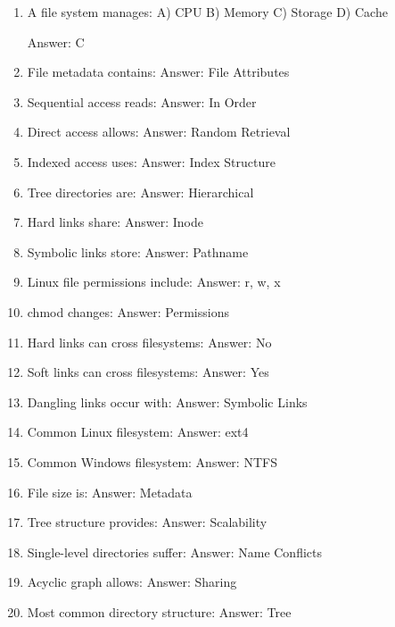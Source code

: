 \begin{enumerate}
\item A file system manages:
A) CPU
B) Memory
C) Storage
D) Cache

Answer: C

\item File metadata contains:
Answer: File Attributes

\item Sequential access reads:
Answer: In Order

\item Direct access allows:
Answer: Random Retrieval

\item Indexed access uses:
Answer: Index Structure

\item Tree directories are:
Answer: Hierarchical

\item Hard links share:
Answer: Inode

\item Symbolic links store:
Answer: Pathname

\item Linux file permissions include:
Answer: r, w, x

\item chmod changes:
Answer: Permissions

\item Hard links can cross filesystems:
Answer: No

\item Soft links can cross filesystems:
Answer: Yes

\item Dangling links occur with:
Answer: Symbolic Links

\item Common Linux filesystem:
Answer: ext4

\item Common Windows filesystem:
Answer: NTFS

\item File size is:
Answer: Metadata

\item Tree structure provides:
Answer: Scalability

\item Single-level directories suffer:
Answer: Name Conflicts

\item Acyclic graph allows:
Answer: Sharing

\item Most common directory structure:
Answer: Tree
\end{enumerate}

